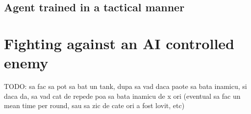 \subsection{Agent trained in a tactical manner}

\section{Fighting against an AI controlled enemy}

TODO: sa fac sa pot sa bat un tank, dupa sa vad daca paote sa bata inamicu, si daca da, sa vad cat de repede poa sa bata inamicu de x ori (eventual sa fac un mean time per round, sau sa zic de cate ori a fost lovit, etc)